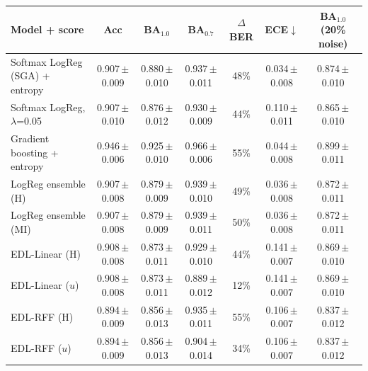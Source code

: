 \begin{tabular}{lcccccc}\toprule
Model + score & Acc & BA$_{1.0}$ & BA$_{0.7}$ & $\Delta$BER & ECE$\downarrow$ & BA$_{1.0}$ (20\% noise)\\\midrule
Softmax LogReg (SGA) + entropy & 0.907\,{\scriptsize$\pm$0.009} & 0.880\,{\scriptsize$\pm$0.010} & 0.937\,{\scriptsize$\pm$0.011} & 48\% & 0.034\,{\scriptsize$\pm$0.008} & 0.874\,{\scriptsize$\pm$0.010}\\
Softmax LogReg, $\lambda$=0.05 & 0.907\,{\scriptsize$\pm$0.010} & 0.876\,{\scriptsize$\pm$0.012} & 0.930\,{\scriptsize$\pm$0.009} & 44\% & 0.110\,{\scriptsize$\pm$0.011} & 0.865\,{\scriptsize$\pm$0.010}\\
Gradient boosting + entropy & 0.946\,{\scriptsize$\pm$0.006} & 0.925\,{\scriptsize$\pm$0.010} & 0.966\,{\scriptsize$\pm$0.006} & 55\% & 0.044\,{\scriptsize$\pm$0.008} & 0.899\,{\scriptsize$\pm$0.011}\\
LogReg ensemble (H) & 0.907\,{\scriptsize$\pm$0.008} & 0.879\,{\scriptsize$\pm$0.009} & 0.939\,{\scriptsize$\pm$0.010} & 49\% & 0.036\,{\scriptsize$\pm$0.008} & 0.872\,{\scriptsize$\pm$0.011}\\
LogReg ensemble (MI) & 0.907\,{\scriptsize$\pm$0.008} & 0.879\,{\scriptsize$\pm$0.009} & 0.939\,{\scriptsize$\pm$0.011} & 50\% & 0.036\,{\scriptsize$\pm$0.008} & 0.872\,{\scriptsize$\pm$0.011}\\
EDL-Linear (H) & 0.908\,{\scriptsize$\pm$0.008} & 0.873\,{\scriptsize$\pm$0.011} & 0.929\,{\scriptsize$\pm$0.010} & 44\% & 0.141\,{\scriptsize$\pm$0.007} & 0.869\,{\scriptsize$\pm$0.010}\\
EDL-Linear ($u$) & 0.908\,{\scriptsize$\pm$0.008} & 0.873\,{\scriptsize$\pm$0.011} & 0.889\,{\scriptsize$\pm$0.012} & 12\% & 0.141\,{\scriptsize$\pm$0.007} & 0.869\,{\scriptsize$\pm$0.010}\\
EDL-RFF (H) & 0.894\,{\scriptsize$\pm$0.009} & 0.856\,{\scriptsize$\pm$0.013} & 0.935\,{\scriptsize$\pm$0.011} & 55\% & 0.106\,{\scriptsize$\pm$0.007} & 0.837\,{\scriptsize$\pm$0.012}\\
EDL-RFF ($u$) & 0.894\,{\scriptsize$\pm$0.009} & 0.856\,{\scriptsize$\pm$0.013} & 0.904\,{\scriptsize$\pm$0.014} & 34\% & 0.106\,{\scriptsize$\pm$0.007} & 0.837\,{\scriptsize$\pm$0.012}\\
\bottomrule\end{tabular}